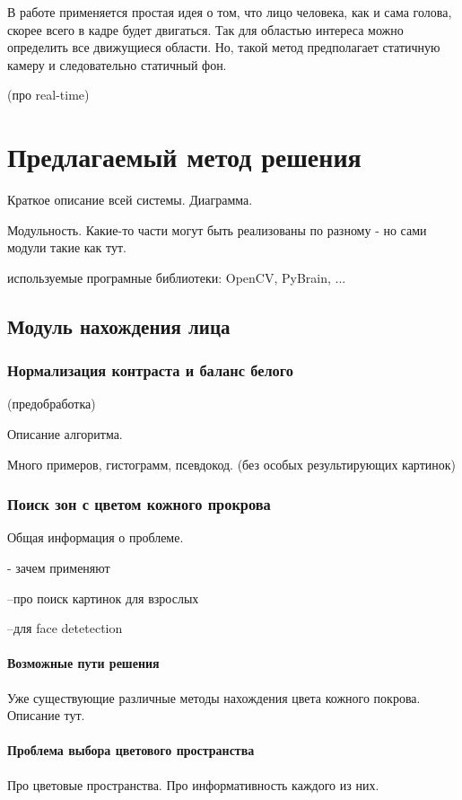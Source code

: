 \documentclass[12pt]{report}
\begin{document}
В работе \citep{zhang2010fast} применяется простая идея о том, что лицо человека, как и сама голова, скорее всего в кадре будет двигаться. Так для областью интереса можно определить все движущиеся области. Но, такой метод предполагает статичную камеру и следовательно статичный фон.

(про real-time)

\chapter{Предлагаемый метод решения}
\thispagestyle{fancy}

Краткое описание всей системы. Диаграмма.

Модульность. Какие-то части могут быть реализованы по разному - но сами модули такие как тут.

используемые програмные библиотеки: OpenCV, PyBrain, ...

\section{Модуль нахождения лица}

\subsection{Нормализация контраста и баланс белого}
(предобработка)

Описание алгоритма.

Много примеров, гистограмм, псевдокод. (без особых результирующих картинок)

\subsection{Поиск зон с цветом кожного прокрова}
Общая информация о проблеме.

- зачем применяют 

	--про поиск картинок для взрослых
	
	--для face detetection
\subsubsection{Возможные пути решения}
Уже существующие различные методы нахождения цвета кожного покрова. Описание тут.
\subsubsection{Проблема выбора цветового пространства}
Про цветовые пространства. Про информативность каждого из них.
\end{document}
